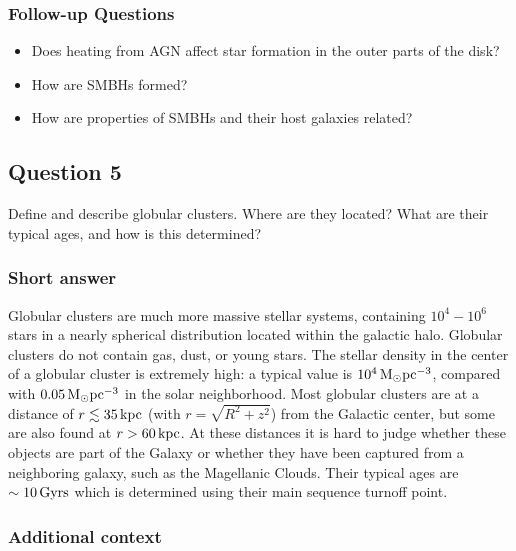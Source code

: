 \documentclass[a4paper,11pt]{article}
\begin{document}
\subsubsection{Follow-up Questions}

\begin{itemize}
    \item Does heating from AGN affect star formation in the outer parts of the disk?
    \item How are SMBHs formed?
    \item How are properties of SMBHs and their host galaxies related?
\end{itemize}


\newpage
\subsection{Question 5}

Define and describe globular clusters. Where are they located? What are their typical ages, and how is this determined?

\subsubsection{Short answer}

Globular clusters are much more massive stellar systems, containing $10^4-10^6$ stars in a nearly spherical distribution located within the galactic halo. Globular clusters do not contain gas, dust, or young stars. The stellar density in the center of a globular cluster is extremely high: a typical value is $10^4\,{\rm M_\odot pc^{-3}}$, compared with $0.05\,{\rm M_\odot pc^{-3}}$ in the solar neighborhood. Most globular clusters are at a distance of $r\lesssim35\,{\rm kpc}$ (with $r=\sqrt{R^2+z^2}$) from the Galactic center, but some are also found at $r>60\,{\rm kpc}$. At these distances it is hard to judge whether these objects are part of the Galaxy or whether they have been captured from a neighboring galaxy, such as the Magellanic Clouds. Their typical ages are $\sim10\,{\rm Gyrs}$ which is determined using their main sequence turnoff point.

\subsubsection{Additional context}
\end{document}
